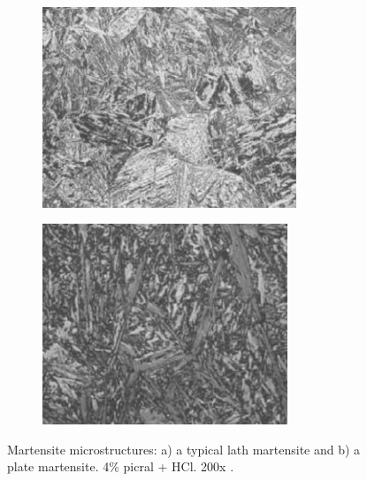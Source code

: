 \documentclass[12pt]{report}
\begin{document}
\begin{figure}[H]
\centering

\begin{subfigure}{.45\textwidth}
    \centering
    \includegraphics[height=6cm, width=\textwidth]{lath_martensite_microstructure.jpg}
    \caption{}
\end{subfigure}
\begin{subfigure}{.45\textwidth}
    \centering
    \includegraphics[height=6cm, width=\textwidth]{plate_martensite_microstructure.jpg}
    \caption{}
\end{subfigure}

\caption{Martensite microstructures: a) a typical lath martensite and b) a plate martensite. 4\% picral + HCl. 200x \cite{molabe2018determining}.}
\label{ch3:figure:martensite:microstructures}
\end{figure}
\end{document}
